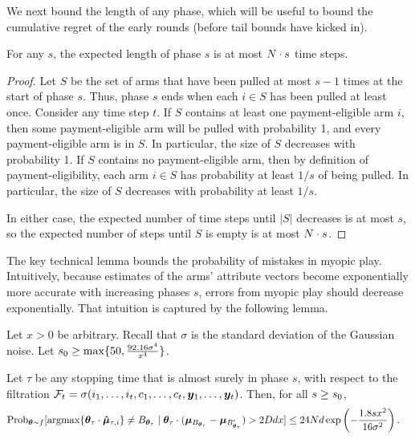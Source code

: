 We next bound the length of any phase, which will be useful to bound
the cumulative regret of the early rounds
(before tail bounds have kicked in).

\begin{lemma} \label{lem:phase-length}
For any $s$, the expected length of phase $s$ is at most
$N \cdot s$ time steps.
\end{lemma}

\begin{proof}
Let $S$ be the set of arms that have been pulled at most
$s-1$ times at the start of phase $s$.
Thus, phase $s$ ends when each $i \in S$ has been pulled at least once.
Consider any time step $t$.
If $S$ contains at least one payment-eligible arm $i$,
then some payment-eligible arm will be pulled with probability 1,
and every payment-eligible arm is in $S$.
In particular, the size of $S$ decreases with probability 1.
If $S$ contains no payment-eligible arm,
then by definition of payment-eligibility,
each arm $i \in S$ has probability at least $1/s$ of being pulled.
In particular, the size of $S$ decreases with probability at least $1/s$.

In either case, the expected number of time steps until
$|S|$ decreases is at most $s$,
so the expected number of steps until $S$ is empty is at most
$N \cdot s$.
\end{proof}
                  
The key technical lemma bounds the probability of mistakes in myopic play.
Intuitively, because estimates of the arms' attribute vectors become
exponentially more accurate with increasing phases $s$,
errors from myopic play should decrease exponentially.
That intuition is captured by the following lemma.

\begin{lemma} \label{lem:round-prob}
Let $x > 0$ be arbitrary.
Recall that $\sigma$ is the standard deviation of the Gaussian noise.
Let $s_0 \geq \max \{ 50, \frac{92.16 \sigma^4}{x^4} \}$.

Let $\tau$ be any stopping time that is almost surely  in phase $s$,
with respect to the filtration
$\mathcal{F}_{t} = \sigma (i_{1}, \ldots, i_{t},
                          c_{1}, \ldots, c_{t},
                          \bm{y}_{1}, \ldots, \bm{y}_{t})$.
Then, for all $s \geq s_0$,
\begin{align*}
  \ProbC[\AgV \sim \AgentDist]{%
  \argmax \SET{\AgentV{\tau} \cdot \ArmEV{\tau}{i}} \neq \Best{\AgentV{\tau}}}{%
  \AgentV{\tau} \cdot (\ArmV{\Best{\AgentV{\tau}}} - \ArmV{\Second{\AgentV{\tau}}})
  > 2\Diam d x}
& \leq 24 \ARMNUM d \exp\left(-\frac{1.8 s x^2}{16 \sigma^2} \right).
\end{align*}
\end{lemma}

